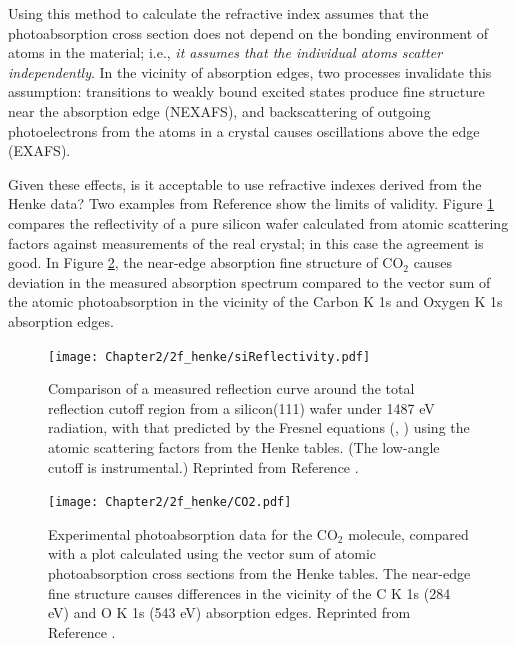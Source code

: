 Using this method to calculate the refractive index assumes that the photoabsorption cross section does not depend on the bonding environment of atoms in the material; i.e., \emph{it assumes that the individual atoms scatter independently}.  In the vicinity of absorption edges, two processes invalidate this assumption: transitions to weakly bound excited states produce fine structure near the absorption edge (NEXAFS), and backscattering of outgoing photoelectrons from the atoms in a crystal causes oscillations above the edge (EXAFS).

Given these effects, is it acceptable to use refractive indexes derived from the Henke data?  Two examples from Reference \cite{Hen93} show the limits of validity.  Figure \ref{henkeValid1} compares the reflectivity of a pure silicon wafer calculated from atomic scattering factors against measurements of the real crystal; in this case the agreement is good.  In Figure \ref{henkeValid2}, the near-edge absorption fine structure of CO$_2$ causes deviation in the measured absorption spectrum compared to the vector sum of the atomic photoabsorption in the vicinity of the Carbon K 1s and Oxygen K 1s absorption edges.

\begin{figure}[htbp] %
   \centering
   \texttt{[image: Chapter2/2f\_henke/siReflectivity.pdf]} 
   \caption[Comparison of a measured reflection curve around the total reflection cutoff region from a silicon(111) wafer under 1487 eV radiation, with that predicted by the Fresnel equations using atomic scattering factors from the Henke tables.]{Comparison of a measured reflection curve around the total reflection cutoff region from a silicon(111) wafer under 1487 eV radiation, with that predicted by the Fresnel equations (\protect {}, \protect {}) using the atomic scattering factors from the Henke tables. (The low-angle cutoff is instrumental.) Reprinted from Reference \protect \cite[Figure 18]{Hen93}.}
   \label{henkeValid1}
\end{figure}
\begin{figure}[htbp] %
   \centering
   \texttt{[image: Chapter2/2f\_henke/CO2.pdf]} 
   \caption[Experimental photoabsorption data for the CO$_2$ molecule, compared with a plot calculated using the vector sum of atomic photoabsorption cross sections from the Henke tables.]{Experimental photoabsorption data for the CO$_2$ molecule, compared with a plot calculated using the vector sum of atomic photoabsorption cross sections from the Henke tables. The near-edge fine structure causes differences in the vicinity of the C K 1s (284 eV) and O K 1s (543 eV) absorption edges.  Reprinted from Reference \protect \cite[Figure 15]{Hen93}.}
   \label{henkeValid2}
\end{figure}

